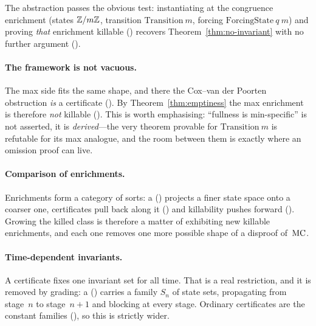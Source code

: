 The abstraction passes the obvious test: instantiating at the congruence
enrichment (states $\mathbb{Z}/m\mathbb{Z}$, transition $\mathrm{Transition}\ m$,
forcing $\mathrm{ForcingState}\ q\ m$) and proving \emph{that} enrichment
killable
()
recovers Theorem~\ref{thm:no-invariant} with no further argument
().

\paragraph{The framework is not vacuous.}
The max side fits the same shape, and there the Cox--van der Poorten
obstruction \emph{is} a certificate
().  By
Theorem~\ref{thm:emptiness} the max enrichment is therefore \emph{not}
killable
().  This is
worth emphasising: ``fullness is min-specific'' is not asserted, it is
\emph{derived}---the very theorem provable for $\mathrm{Transition}\ m$
is refutable for its max analogue, and the room between them is exactly
where an omission proof can live.

\paragraph{Comparison of enrichments.}
Enrichments form a category of sorts: a 
() projects a finer state
space onto a coarser one, certificates pull back along it
() and killability pushes
forward
().  Growing the killed
class is therefore a matter of exhibiting new killable enrichments, and
each one removes one more possible shape of a disproof of~$\mathrm{MC}$.

\paragraph{Time-dependent invariants.}
A certificate fixes one invariant set for all time.  That is a real
restriction, and it is removed by grading: a
() carries a
family $S_n$ of state sets, propagating from stage~$n$ to stage~$n{+}1$
and blocking at every stage.  Ordinary certificates are the constant
families
(), so this is
strictly wider.

